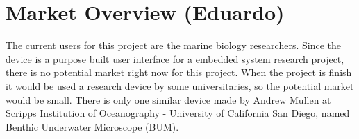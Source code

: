 \section{Market Overview (Eduardo)}
The current users for this project are the marine biology researchers. Since the device is a purpose built user interface for a embedded system research project, there is no potential market right now for this project. When the project is finish it would be used a research device by some universitaries, so the potential market would be small. There is only one similar device made by Andrew Mullen at Scripps Institution of Oceanography - University of California San Diego, named Benthic Underwater Microscope (BUM).
